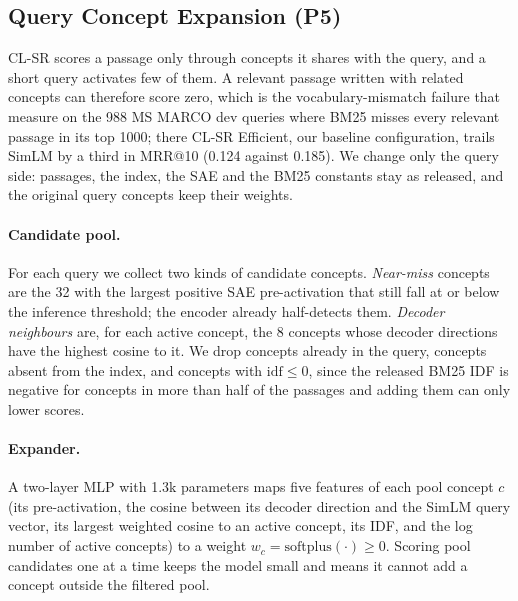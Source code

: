 
\subsection{Query Concept Expansion (P5)}
\label{sec:p5}

CL-SR scores a passage only through concepts it shares with the query, and a short query activates few of
them. A relevant passage written with related concepts can therefore score zero, which is the
vocabulary-mismatch failure that \citet{park2025decoding} measure on the 988 MS MARCO dev queries where BM25
misses every relevant passage in its top 1000; there CL-SR Efficient, our baseline configuration, trails
SimLM by a third in MRR@10 (0.124 against 0.185). We change only the query side: passages, the index, the SAE and the BM25 constants stay as released,
and the original query concepts keep their weights.

\paragraph{Candidate pool.}
For each query we collect two kinds of candidate concepts. \emph{Near-miss} concepts are the 32 with the
largest positive SAE pre-activation that still fall at or below the inference threshold; the encoder already
half-detects them. \emph{Decoder neighbours} are, for each active concept, the 8 concepts whose decoder
directions have the highest cosine to it. We drop concepts already in the query, concepts absent from the
index, and concepts with $\mathrm{idf}\le 0$, since the released BM25 IDF is negative for concepts in more
than half of the passages and adding them can only lower scores.

\paragraph{Expander.}
A two-layer MLP with 1.3k parameters maps five features of each pool concept $c$ (its pre-activation, the
cosine between its decoder direction and the SimLM query vector, its largest weighted cosine to an active
concept, its IDF, and the log number of active concepts) to a weight $w_c=\mathrm{softplus}(\cdot)\ge 0$.
Scoring pool candidates one at a time keeps the model small and means it cannot add a concept outside the
filtered pool.

